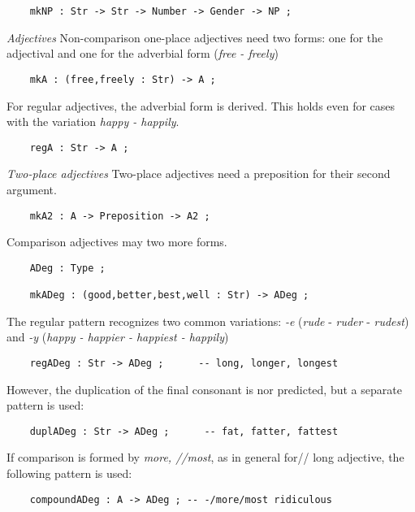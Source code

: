 \documentclass[11pt,a4paper]{article}
\newcommand{\subsubsubsection}[1]{\textit{#1}}
\begin{document}
\begin{verbatim}
    mkNP : Str -> Str -> Number -> Gender -> NP ; 
\end{verbatim}

\subsubsubsection{Adjectives}
Non-comparison one-place adjectives need two forms: one for
the adjectival and one for the adverbial form (\textit{free - freely})

\begin{verbatim}
    mkA : (free,freely : Str) -> A ;
\end{verbatim}

For regular adjectives, the adverbial form is derived. This holds
even for cases with the variation \textit{happy - happily}.

\begin{verbatim}
    regA : Str -> A ;
\end{verbatim}

\subsubsubsection{Two-place adjectives}
Two-place adjectives need a preposition for their second argument.

\begin{verbatim}
    mkA2 : A -> Preposition -> A2 ;
\end{verbatim}

Comparison adjectives may two more forms. 

\begin{verbatim}
    ADeg : Type ;
  
    mkADeg : (good,better,best,well : Str) -> ADeg ;
\end{verbatim}

The regular pattern recognizes two common variations: 
\textit{-e} (\textit{rude} - \textit{ruder} - \textit{rudest}) and
\textit{-y} (\textit{happy - happier - happiest - happily})

\begin{verbatim}
    regADeg : Str -> ADeg ;      -- long, longer, longest
\end{verbatim}

However, the duplication of the final consonant is nor predicted,
but a separate pattern is used:

\begin{verbatim}
    duplADeg : Str -> ADeg ;      -- fat, fatter, fattest
\end{verbatim}

If comparison is formed by \textit{more, //most}, as in general for//
long adjective, the following pattern is used:

\begin{verbatim}
    compoundADeg : A -> ADeg ; -- -/more/most ridiculous
\end{verbatim}
\end{document}
